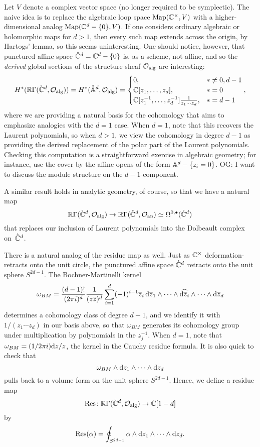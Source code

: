 \documentclass[11pt]{amsart}
\def\owen#1{{\textcolor{violet!65!black}{OG: {#1}}}}
\begin{document}
Let $V$ denote a complex vector space (no longer required to be symplectic).
The naive idea is to replace the algebraic loop space $\Map(\CC^\times,  V)$ with a higher-dimensional analog $\Map(\CC^d -\{0\}, V)$.
If one considers ordinary algebraic or holomorphic maps for $d > 1$, 
then every such map extends across the origin, by Hartogs' lemma,
so this seems uninteresting.
One should notice, however, that punctured affine space $\mathring{\CC}^d = \CC^d -\{0\}$ is, as a scheme, not affine, 
and so the {\em derived} global sections of the structure sheaf $\cO_{\rm alg}$ are interesting:
\[
H^*(\RR \Gamma(\mathring{\CC}^d, \cO_{\rm alg})) = H^* (\mathring{\AA}^d, \cO_{\rm alg}) 
= \begin{cases} 
0, & * \neq 0, d-1 \\ 
\CC[z_1,\ldots,z_d], & * = 0 \\ 
\CC[z_1^{-1},\ldots,z_d^{-1}] \frac{1}{z_1 \cdots z_d}, & * = d-1 
\end{cases},
\]
where we are providing a natural basis for the cohomology 
that aims to emphasize analogies with the $d=1$ case.
When $d=1$, note that this recovers the Laurent polynomials,
so when $d > 1$, 
we view the cohomology in degree $d-1$ as providing the derived replacement of the polar part of the Laurent polynomials.
Checking this computation is a straightforward exercise in algebraic geometry;
for instance, use the cover by the affine opens of the form $\AA^d - \{z_i =0\}$.
\owen{I want to discuss the module structure on the $d-1$-component.}

A similar result holds in analytic geometry, of course,
so that we have a natural map
\[
\RR \Gamma(\mathring{\CC}^d, \cO_{\rm alg}) \to \RR \Gamma(\mathring{\CC}^d, \cO_{\rm an}) \simeq \Omega^{0,\bu}(\mathring{\CC}^d)
\]
that replaces our inclusion of Laurent polynomials into the Dolbeault complex on~$\mathring{\CC}^d$.

There is a natural analog of the residue map as well.
Just as $\CC^\times$ deformation-retracts onto the unit circle,
the punctured affine space $\mathring{\CC}^d$ retracts onto the unit sphere $S^{2d-1}$.
The Bochner-Martinelli kernel 
\[
\omega_{BM} = \frac{(d-1)!}{(2 \pi i)^d} \frac{1}{(z\zbar)^d} \sum_{i=1}^d (-1)^{i-1} \zbar_i\, \d \zbar_1 \wedge \cdots \wedge \Hat{\d \zbar_i} \wedge \cdots \wedge \d \zbar_d
\]
determines a cohomology class of degree $d-1$, and we identify it with $1/(z_1 \cdots z_d)$ in our basis above,
so that $\omega_{BM}$ generates its cohomology group under multiplication by polynomials in the $z_j^{-1}$.
When $d = 1$, note that $\omega_{BM} = (1/2\pi i)\d z/z$, the kernel in the Cauchy residue formula.
It is also quick to check that
\[
\omega_{BM} \wedge \d z_1 \wedge \cdots \wedge \d z_d
\]
pulls back to a volume form on the unit sphere $S^{2d-1}$.
Hence, we define a residue map
\[
\Res \colon \RR \Gamma(\mathring{\CC}^d, \cO_{\rm alg})  \to \CC[1-d]
\]
by
\[
\Res(\alpha) = \oint_{S^{2d-1}} \alpha \wedge \d z_1 \wedge \cdots \wedge \d z_d.
\]
\end{document}
